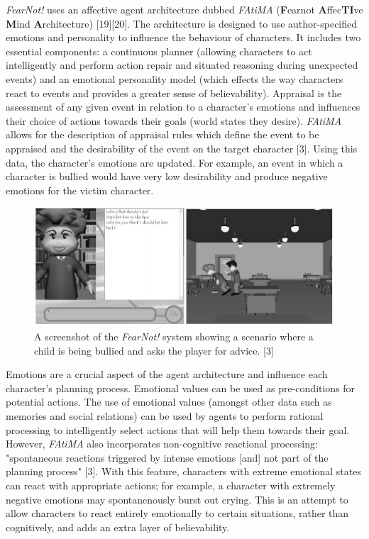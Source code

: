 \documentclass{sig-alternate-05-2015}
\begin{document}
\textit{FearNot!} uses an affective agent architecture dubbed \textit{FAtiMA} (\textbf{F}earnot \textbf{A}ffec\textbf{TI}ve \textbf{M}ind \textbf{A}rchitecture) [19][20]. The architecture is designed to use author-specified emotions and personality to influence the behaviour of characters. It includes two essential components: a continuous planner (allowing characters to act intelligently and perform action repair and situated reasoning during unexpected events) and an emotional personality model (which effects the way characters react to events and provides a greater sense of believability). Appraisal is the assessment of any given event in relation to a character's emotions and influences their choice of actions towards their goals (world states they desire). \textit{FAtiMA} allows for the description of appraisal rules which define the event to be appraised and the desirability of the event on the target character [3]. Using this data, the character's emotions are updated. For example, an event in which a character is bullied would have very low desirability and produce negative emotions for the victim character.\\

\begin{figure}
\centering
\includegraphics[scale=0.43]{Images/FearNot.png}
\caption{A screenshot of the \textit{FearNot!} system showing a scenario where a child is being bullied and asks the player for advice. [3]}
\end{figure}

Emotions are a crucial aspect of the agent architecture and influence each character's planning process. Emotional values can be used as pre-conditions for potential actions. The use of emotional values (amongst other data such as memories and social relations) can be used by agents to perform rational processing to intelligently select actions that will help them towards their goal. However, \textit{FAtiMA} also incorporates non-cognitive reactional processing: "spontaneous reactions triggered by intense emotions [and] not part of the planning process" [3]. With this feature, characters with extreme emotional states can react with appropriate actions; for example, a character with extremely negative emotions may spontanenously burst out crying. This is an attempt to allow characters to react entirely emotionally to certain situations, rather than cognitively, and adds an extra layer of believability.
\end{document}
